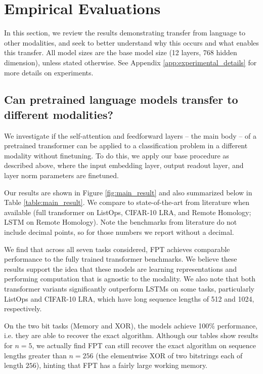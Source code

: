 
\section{Empirical Evaluations}
\label{sec:experiments}

In this section, we review the results demonstrating transfer from language to other modalities, and seek to better understand why this occurs and what enables this transfer.
All model sizes are the base model size (12 layers, 768 hidden dimension), unless stated otherwise.
See Appendix \ref{app:experimental_details} for more details on experiments.

\subsection{Can pretrained language models transfer to different modalities?}
\label{sec:transfer}

We investigate if the self-attention and feedforward layers -- the main body -- of a pretrained transformer can be applied to a classification problem in a different modality without finetuning.
To do this, we apply our base procedure as described above, where the input embedding layer, output readout layer, and layer norm parameters are finetuned.

Our results are shown in Figure \ref{fig:main_result} and also summarized below in Table \ref{table:main_result}.
We compare to state-of-the-art from literature when available (full transformer on ListOps, CIFAR-10 LRA, and Remote Homology; LSTM on Remote Homology).
Note the benchmarks from literature do not include decimal points, so for those numbers we report without a decimal.

We find that across all seven tasks considered, FPT achieves comparable performance to the fully trained transformer benchmarks.
We believe these results support the idea that these models are learning representations and performing computation that is agnostic to the modality.
We also note that both transformer variants significantly outperform LSTMs on some tasks, particularly ListOps and CIFAR-10 LRA, which have long sequence lengths of 512 and 1024, respectively.

On the two bit tasks (Memory and XOR), the models achieve 100\% performance, i.e. they are able to recover the exact algorithm.
Although our tables show results for $n=5$, we actually find FPT can still recover the exact algorithm on sequence lengths greater than $n=256$ (the elementwise XOR of two bitstrings each of length $256$), hinting that FPT has a fairly large working memory.

